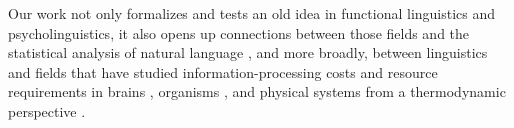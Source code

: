 Our work not only formalizes and tests an old idea in functional linguistics and psycholinguistics, it also opens up connections between those fields and the statistical analysis of natural language \citep{debowski-excess-2011,bentz2017word,lin-critical-2017}, and more broadly, between linguistics and fields that have studied information-processing costs and resource requirements in brains \citep{friston}, organisms \citep{england}, and physical systems from a thermodynamic perspective \citep{still2012thermodynamic}. %
















